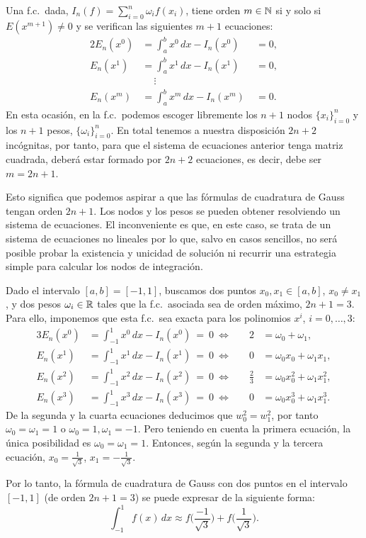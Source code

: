 Una f.c.\ dada, $I_n(f)=\sum_{i=0}^n \omega_i f(x_i)$, tiene orden
$m\in\operatorname{{\mathbb N}}$ si y solo si $E(x^{m+1})\neq 0$ y se verifican las
siguientes $m+1$ ecuaciones:
\begin{alignat*}{2}
  E_n(x^0)&=\int_a^b x^0\, dx -I_n(x^0)&\; =0, \\
  E_n(x^1)&=\int_a^b x^1\, dx -I_n(x^1)&\; =0, \\
  &~\quad\vdots \\
  E_n(x^m)&=\int_a^b x^m\, dx -I_n(x^m)&\; =0.
\end{alignat*}
En esta ocasión, en la f.c.\ podemos escoger libremente los $n+1$ nodos
$\{x_i\}_{i=0}^n$ y los $n+1$ pesos, $\{\omega_i\}_{i=0}^n$. En total
tenemos a nuestra disposición $2n+2$ incógnitas, por tanto, para que
el sistema de ecuaciones anterior tenga matriz cuadrada, deberá estar
formado por $2n+2$ ecuaciones, es decir, debe ser $m=2n+1$.

Esto significa que podemos aspirar a que las fórmulas de cuadratura de
Gauss tengan orden $2n+1$. Los nodos y los pesos se pueden obtener
resolviendo un sistema de ecuaciones. El inconveniente es que, en este
caso, se trata de un sistema de ecuaciones no lineales por lo que,
salvo en casos sencillos, no será posible probar la existencia y
unicidad de solución ni recurrir una estrategia simple para calcular
los nodos de integración.


\begin{example}
  Dado el intervalo $[a,b]=[-1,1]$, buscamos dos puntos
  $x_0,x_1\in [a,b]$, $x_0\neq x_1$, y dos pesos $\omega_i\in\operatorname{{\mathbb R}}$
  tales que la f.c.\ asociada sea de orden máximo, $2n+1=3$. Para
  ello, imponemos que esta f.c.\ sea exacta para los polinomios $x^i$,
  $i=0,\dots,3$:
  \begin{alignat*}{3}
    E_n(x^0)&=\int_{-1}^1 x^0\, dx - I_n(x^0)\ =\ 0 \ \Leftrightarrow
    \quad & 2 &= \omega_0+\omega_1,\\
    E_n(x^1)&=\int_{-1}^1 x^1\, dx - I_n(x^1)\ =\ 0 \ \Leftrightarrow
    \quad & 0 &=  \omega_0x_0+\omega_1x_1,\\
    E_n(x^2)&=\int_{-1}^1 x^2\, dx - I_n(x^2)\ =\ 0 \ \Leftrightarrow
    \quad & \frac{2}{3} &= \omega_0x_0^2+\omega_1x_1^2,\\
    E_n(x^3)&=\int_{-1}^1 x^3\, dx - I_n(x^3)\ =\ 0 \ \Leftrightarrow
    \quad &0 &=
    \omega_0x_0^3+\omega_1x_1^3.
  \end{alignat*}
  De la segunda y la cuarta ecuaciones deducimos que $w_0^2=w_1^2$,
  por tanto $\omega_0=\omega_1=1$ o $\omega_0=1, \omega_1=-1$.  Pero
  teniendo en cuenta la primera ecuación, la única posibilidad es
  $\omega_0=\omega_1=1$. Entonces, según la segunda y la tercera
  ecuación, $x_0=\frac{1}{\sqrt 3}$, $x_1=-\frac{1}{\sqrt 3}$.

  Por lo tanto, la fórmula de cuadratura de Gauss con dos puntos en el
  intervalo $[-1,1]$ (de orden $2n+1=3$) se puede expresar de la
  siguiente forma:
  \begin{equation*}
    \int_{-1}^1 f(x)\, dx \approx f\Big( \frac{-1}{\sqrt 3} \Big)
    + f\Big(\frac{1}{\sqrt 3}\Big).
  \end{equation*}
\end{example}

